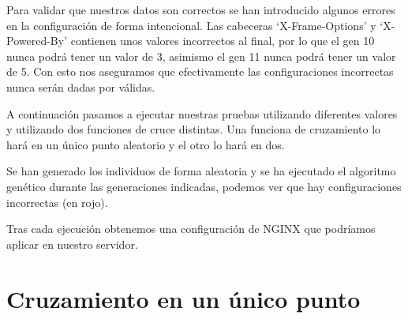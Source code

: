 \bigskip
Para validar que nuestros datos son correctos se han introducido algunos errores en la configuración de forma intencional. Las cabeceras `X-Frame-Options' y `X-Powered-By' contienen unos valores incorrectos al final, por lo que el gen 10 nunca podrá tener un valor de 3, asimismo el gen 11 nunca podrá tener un valor de 5. Con esto nos aseguramos que efectivamente las configuraciones incorrectas nunca serán dadas por válidas.

\bigskip
A continuación pasamos a ejecutar nuestras pruebas utilizando diferentes valores y utilizando dos funciones de cruce distintas. Una funciona de cruzamiento lo hará en un único punto aleatorio y el otro lo hará en dos.

\bigskip
Se han generado los individuos de forma aleatoria y se ha ejecutado el algoritmo genético durante las generaciones indicadas, podemos ver que hay configuraciones incorrectas (en rojo).

\bigskip
Tras cada ejecución obtenemos una configuración de NGINX que podríamos aplicar en nuestro servidor.

\section{Cruzamiento en un único punto}

